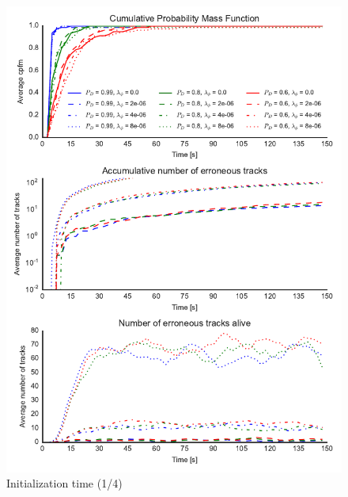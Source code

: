 \begin{figure}
\centering
\includegraphics{Figures/plots/Scenario0_Init-Time(1-4).pdf}
\caption{Initialization time (1/4)}\label{fig:init_time_1-4}
\end{figure}

